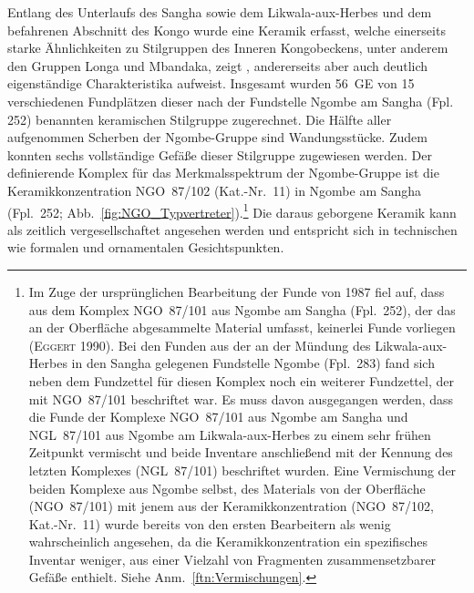Entlang des Unterlaufs des \mbox{Sangha} sowie dem \mbox{Likwala}-\mbox{aux}-\mbox{Herbes} und dem befahrenen Abschnitt des Kongo wurde eine Keramik erfasst, welche einerseits starke Ähnlichkeiten zu Stilgruppen des Inneren Kongobeckens, unter anderem den Gruppen Longa und Mbandaka, zeigt \parencite[121--128, 139--143]{Wotzka.1995}, andererseits aber auch deutlich eigenständige Charakteristika aufweist. Insgesamt wurden 56~GE von 15 verschiedenen Fundplätzen dieser nach der Fundstelle Ngombe am \mbox{Sangha} (Fpl. 252) benannten keramischen Stilgruppe zugerechnet. Die Hälfte aller aufgenommen Scherben der Ngombe-Gruppe sind Wandungsstücke. Zudem konnten sechs vollständige Gefäße dieser Stilgruppe zugewiesen werden. Der definierende Komplex für das Merkmalsspektrum der Ngombe-Gruppe ist die Keramikkonzentration NGO~87/102 (Kat.-Nr.~11) in Ngombe am \mbox{Sangha} (Fpl.~252; Abb.~\ref{fig:NGO_Typvertreter}).\footnote{Im Zuge der ursprünglichen Bearbeitung der Funde von 1987 fiel auf, dass aus dem Komplex NGO~87/101 aus Ngombe am \mbox{Sangha} (Fpl.~252), der das an der Oberfläche abgesammelte Material umfasst, keinerlei Funde vorliegen (\textsc{Eggert} 1990). Bei den Funden aus der an der Mündung des \mbox{Likwala}-\mbox{aux}-\mbox{Herbes} in den \mbox{Sangha} gelegenen Fundstelle Ngombe (Fpl.~283) fand sich neben dem Fundzettel für diesen Komplex noch ein weiterer Fundzettel, der mit NGO~87/101 beschriftet war. Es muss davon ausgegangen werden, dass die Funde der Komplexe NGO~87/101 aus Ngombe am \mbox{Sangha} und NGL~87/101 aus Ngombe am \mbox{Likwala}-\mbox{aux}-\mbox{Herbes} zu einem sehr frühen Zeitpunkt vermischt und beide Inventare anschließend mit der Kennung des letzten Komplexes (NGL~87/101) beschriftet wurden. Eine Vermischung der beiden Komplexe aus Ngombe selbst, des Materials von der Oberfläche (NGO~87/101) mit jenem aus der Keramikkonzentration (NGO~87/102, Kat.-Nr.~11) wurde bereits von den ersten Bearbeitern als wenig wahrscheinlich angesehen, da die Keramikkonzentration ein spezifisches Inventar weniger, aus einer Vielzahl von Fragmenten zusammensetzbarer Gefäße enthielt. Siehe Anm.~\ref{ftn:Vermischungen}.} Die daraus geborgene Keramik kann als zeitlich vergesellschaftet angesehen werden und entspricht sich in technischen wie formalen und ornamentalen Gesichtspunkten.

